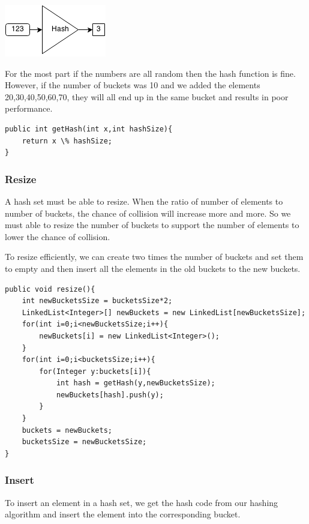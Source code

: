 \documentclass[11pt,oneside]{book}
\makeatletter
\def\maxwidth#1{\ifdim\Gin@nat@width>#1 #1\else\Gin@nat@width\fi}
\makeatother
\begin{document}
\includegraphics[width=\maxwidth{\textwidth}]{hashcode.png}

For the most part if the numbers are all random then the hash function is fine. However, if the number of buckets was 10 and we added the elements 20,30,40,50,60,70, they will all end up in the same bucket and results in poor performance.

\begin{lstlisting}
public int getHash(int x,int hashSize){
    return x \% hashSize;
}
\end{lstlisting}

\subsubsection{Resize}

A hash set must be able to resize. When the ratio of number of elements to number of buckets, the chance of collision will increase more and more. So we must able to resize the number of buckets to support the number of elements to lower the chance of collision.

To resize efficiently, we can create two times the number of buckets and set them to empty and then insert all the elements in the old buckets to the new buckets.

\begin{lstlisting}
public void resize(){
    int newBucketsSize = bucketsSize*2;
    LinkedList<Integer>[] newBuckets = new LinkedList[newBucketsSize];
    for(int i=0;i<newBucketsSize;i++){
        newBuckets[i] = new LinkedList<Integer>();
    }
    for(int i=0;i<bucketsSize;i++){
        for(Integer y:buckets[i]){
            int hash = getHash(y,newBucketsSize);
            newBuckets[hash].push(y);
        }
    }
    buckets = newBuckets;
    bucketsSize = newBucketsSize;
}
\end{lstlisting}

\subsubsection{Insert}

To insert an element in a hash set, we get the hash code from our hashing algorithm and insert the element into the corresponding bucket.
\end{document}
